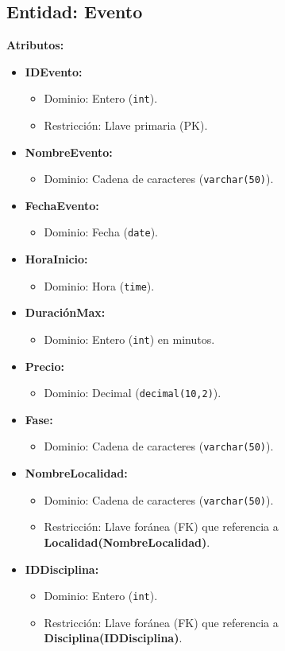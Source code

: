 \subsection*{Entidad: Evento}
\textbf{Atributos:}
\begin{itemize}
    \item \textbf{IDEvento:}
    \begin{itemize}
        \item Dominio: Entero (\texttt{int}).
        \item Restricción: Llave primaria (PK).
    \end{itemize}
    \item \textbf{NombreEvento:}
    \begin{itemize}
        \item Dominio: Cadena de caracteres (\texttt{varchar(50)}).
    \end{itemize}
    \item \textbf{FechaEvento:}
    \begin{itemize}
        \item Dominio: Fecha (\texttt{date}).
    \end{itemize}
    \item \textbf{HoraInicio:}
    \begin{itemize}
        \item Dominio: Hora (\texttt{time}).
    \end{itemize}
    \item \textbf{DuraciónMax:}
    \begin{itemize}
        \item Dominio: Entero (\texttt{int}) en minutos.
    \end{itemize}
    \item \textbf{Precio:}
    \begin{itemize}
        \item Dominio: Decimal (\texttt{decimal(10,2)}).
    \end{itemize}
    \item \textbf{Fase:}
    \begin{itemize}
        \item Dominio: Cadena de caracteres (\texttt{varchar(50)}).
    \end{itemize}
    \item \textbf{NombreLocalidad:}
    \begin{itemize}
        \item Dominio: Cadena de caracteres (\texttt{varchar(50)}).
        \item Restricción: Llave foránea (FK) que referencia a \textbf{Localidad(NombreLocalidad)}.
    \end{itemize}
    \item \textbf{IDDisciplina:}
    \begin{itemize}
        \item Dominio: Entero (\texttt{int}).
        \item Restricción: Llave foránea (FK) que referencia a \textbf{Disciplina(IDDisciplina)}.
    \end{itemize}
\end{itemize}


